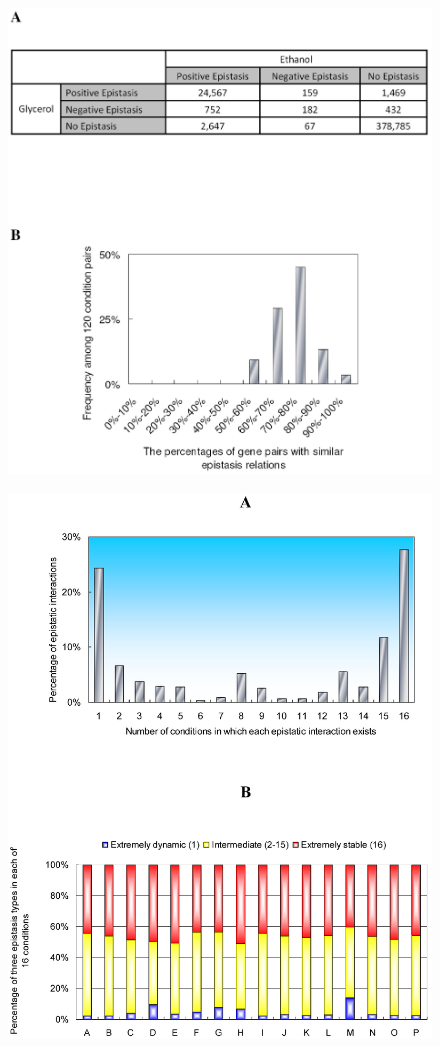 \documentclass{article}
\begin{document}
\begin{figure}[H]
\caption{}
\label{fig:eef2}
\centering
\includegraphics[width=\textwidth]{envFigure_2}
\end{figure}

\begin{figure}[H]
\caption{}
\label{fig:eef3}
\centering
\includegraphics[width=\textwidth]{envFigure_3}
\end{figure}
\end{document}
